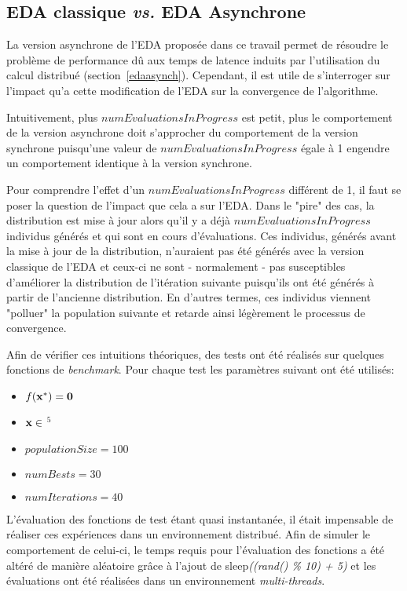 \documentclass[a4paper, 11pt]{report}
\begin{document}
\subsection{EDA classique \textit{vs.} EDA Asynchrone}
\label{edavsasync}
La version asynchrone de l'EDA proposée dans ce travail permet de résoudre le problème de performance dû aux temps de latence induits par l'utilisation du calcul distribué (section~\ref{edaasynch}). Cependant, il est utile de s'interroger sur l'impact qu'a cette modification de l'EDA sur la convergence de l'algorithme.

Intuitivement, plus $numEvaluationsInProgress$ est petit, plus le comportement de la version asynchrone doit s'approcher du comportement de la version synchrone puisqu'une valeur de $numEvaluationsInProgress$ égale à 1 engendre un comportement identique à la version synchrone.

Pour comprendre l'effet d'un $numEvaluationsInProgress$ différent de 1, il faut se poser la question de l'impact que cela a sur l'EDA. Dans le "pire" des cas, la distribution est mise à jour alors qu'il y a déjà $numEvaluationsInProgress$ individus générés et qui sont en cours d'évaluations. Ces individus, générés avant la mise à jour de la distribution, n'auraient pas été générés avec la version classique de l'EDA et ceux-ci ne sont - normalement - pas susceptibles d'améliorer la distribution de l'itération suivante puisqu'ils ont été générés à partir de l'ancienne distribution. En d'autres termes, ces individus viennent "polluer" la population suivante et retarde ainsi légèrement le processus de convergence.

Afin de vérifier ces intuitions théoriques, des tests ont été réalisés sur quelques fonctions de \textit{benchmark}. Pour chaque test les paramètres suivant ont été utilisés:
\begin{itemize}
\item $f(\bf{x}^*) = 0$
\item $\bf{x} \in $ $^{5}$
\item $populationSize = 100$
\item $numBests = 30$
\item $numIterations = 40$
\end{itemize}
L'évaluation des fonctions de test étant quasi instantanée, il était impensable de réaliser ces expériences dans un environnement distribué. Afin de simuler le comportement de celui-ci, le temps requis pour l'évaluation des fonctions a été altéré de manière aléatoire grâce à l'ajout de sleep\textit{((\textnormal{rand}() \% 10) + 5)} et les évaluations ont été réalisées dans un environnement \textit{multi-threads}. 
\end{document}

